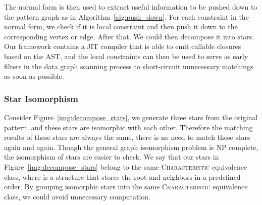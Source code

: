 The normal form is then used to extract useful information to be pushed down to the pattern graph as in Algorithm~\ref{alg:push_down}.
For each constraint in the normal form, we check if it is local constraint and then push it down to the corresponding vertex or edge.
After that, We could then decompose it into stars.
Our framework contains a JIT compiler that is able to emit callable closures based on the AST,
and the local constraints can then be used to serve as early filters in the data graph scanning process to short-circuit unnecessary matchings as soon as possible.
\subsubsection{Star Isomorphism}
Consider Figure~\ref{img:decompose_stars}, we generate three stars from the original pattern,
and these stars are isomorphic with each other.
Therefore the matching results of these stars are always the same,
there is no need to match these stars again and again.
Though the general graph isomorphism problem is NP complete,
the isomorphism of stars are easier to check.
We say that our stars in Figure~\ref{img:decompose_stars} belong to the same \textsc{Characteristic} equivalence class,
where  is a structure that stores the root and neighbors in a predefined order.
By grouping isomorphic stars into the same \textsc{Characteristic} equivalence class,
we could avoid unnecessary computation.
